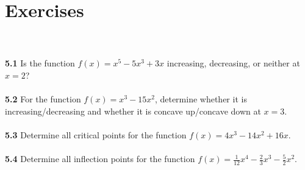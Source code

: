\documentclass[11pt]{scrartcl}
\begin{document}
\section{Exercises}\\
\\
\noindent 
\textbf{5.1} Is the function $f(x)=x^5-5x^3+3x$ increasing, decreasing, or neither at $x=2$? \\
\\
\noindent 
\textbf{5.2} For the function $f(x)=x^3-15x^2$, determine whether it is increasing/decreasing and whether it is concave up/concave down at $x=3$.  \\
\\
\noindent 
\textbf{5.3} Determine all critical points for the function $f(x)=4x^3-14x^2+16x$. \\
\\
\noindent 
\textbf{5.4} Determine all inflection points for the function $f(x)=\frac{1}{12}x^4-\frac{2}{3}x^3-\frac{5}{2}x^2$.
\end{document}
